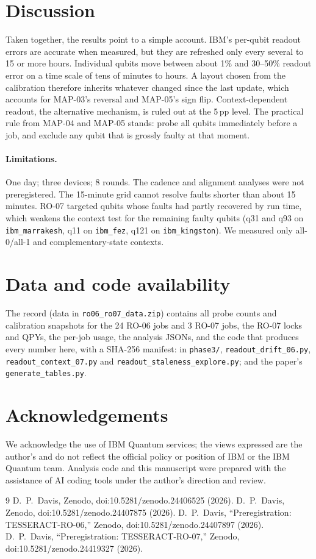 \documentclass[10pt,twocolumn]{article}
\begin{document}
\section{Discussion}
Taken together, the results point to a simple account. IBM's per-qubit readout errors are accurate
when measured, but they are refreshed only every several to 15 or more hours. Individual qubits move
between about 1\% and 30--50\% readout error on a time scale of tens of minutes to hours. A layout
chosen from the calibration therefore inherits whatever changed since the last update, which accounts
for MAP-03's reversal and MAP-05's sign flip. Context-dependent readout, the alternative mechanism,
is ruled out at the 5\,pp level. The practical rule from MAP-04 and MAP-05 stands: probe all qubits
immediately before a job, and exclude any qubit that is grossly faulty at that moment.

\paragraph{Limitations.} One day; three devices; 8 rounds. The cadence and alignment analyses were not
preregistered. The 15-minute grid cannot resolve faults shorter than about 15 minutes. RO-07 targeted
qubits whose faults had partly recovered by run time, which weakens the context test for the
remaining faulty qubits (q31 and q93 on \texttt{ibm\_marrakesh}, q11 on \texttt{ibm\_fez}, q121 on
\texttt{ibm\_kingston}). We measured only all-0/all-1 and complementary-state contexts.

\section*{Data and code availability}
The record (data in \texttt{ro06\_ro07\_data.zip}) contains all probe counts and calibration snapshots for the 24 RO-06 jobs and 3 RO-07
jobs, the RO-07 locks and QPYs, the per-job usage, the analysis JSONs, and the code that produces
every number here, with a SHA-256 manifest: in \texttt{phase3/}, \texttt{readout\_drift\_06.py},
\texttt{readout\_context\_07.py} and \texttt{readout\_staleness\_explore.py}; and the paper's
\texttt{generate\_tables.py}.

\section*{Acknowledgements}
We acknowledge the use of IBM Quantum services; the views expressed are the author's and do not
reflect the official policy or position of IBM or the IBM Quantum team. Analysis code and this
manuscript were prepared with the assistance of AI coding tools under the author's direction and
review.

\begin{thebibliography}{9}\small
{} D.~P.~Davis, Zenodo, doi:10.5281/zenodo.24406525 (2026).
 D.~P.~Davis, Zenodo, doi:10.5281/zenodo.24407875 (2026).
 D.~P.~Davis, ``Preregistration: TESSERACT-RO-06,'' Zenodo, doi:10.5281/zenodo.24407897 (2026).
 D.~P.~Davis, ``Preregistration: TESSERACT-RO-07,'' Zenodo, doi:10.5281/zenodo.24419327 (2026).
\end{thebibliography}
\end{document}
